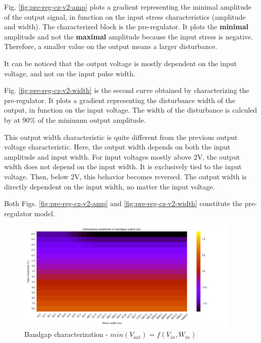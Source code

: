 Fig. \ref{fig:pre-reg-cz-v2-amp} plots a gradient representing the minimal amplitude of the output signal,
in function on the input stress characteristics (amplitude and width).
The characterized block is the pre-regulator.
It plots the \textbf{minimal} amplitude and not the \textbf{maximal} amplitude because the input stress is negative.
Therefore, a smaller value on the output means a larger disturbance.

It can be noticed that the output voltage is mostly dependent on the input voltage, and not on the input pulse width.

Fig. \ref{fig:pre-reg-cz-v2-width} is the second curve obtained by characterizing the pre-regulator.
It plots a gradient representing the disturbance width of the output, in function on the input voltage.
The width of the disturbance is calculed by at 90\% of the minimum output amplitude.

This output width characteristic is quite different from the previous output voltage characteristic.
Here, the output width depends on both the input amplitude and input width.
For input voltages mostly above 2V, the output width does not depend on the input width.
It is exclusively tied to the input voltage.
Then, below 2V, this behavior becomes reversed. The output width is directly dependent on the input width,
no matter the input voltage.

Both Figs. \ref{fig:pre-reg-cz-v2-amp} and \ref{fig:pre-reg-cz-v2-width} constitute the pre-regulator model.

\begin{figure}[!htb]
  \centering
  \includegraphics[width=0.95\textwidth]{src/4/figures/bandgap_cz_V2_amplitude.png}
  \caption{Bandgap characterization - $min(V_{out}) = f(V_{in}, W_{in})$}
  \label{fig:bandgap-cz-v2-amp}
\end{figure}

